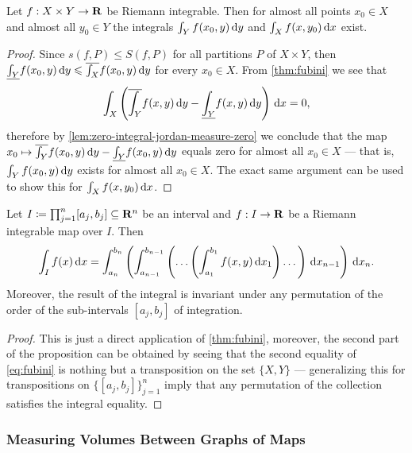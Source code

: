 \begin{corollary}
\label{cor:riemann-int-XxY-almost-int-X-and-Y}
Let \(f: X \times Y \to \mathbf{R}\) be Riemann integrable. Then for almost all points
\(x_0 \in X\) and almost all \(y_0 \in Y\) the integrals \(\int_Y f(x_0, y)\,
\mathrm{d} y\) and \(\int_X f(x, y_0)\, \mathrm{d} x\) exist.
\end{corollary}

\begin{proof}
Since \(s(f, P) \leq S(f, P)\) for all partitions \(P\) of \(X \times Y\), then
\(\underline{\int_Y} f(x_0, y)\, \mathrm{d} y \leqslant \overline{\int_X} f(x_0, y)\,
\mathrm{d} y\) for every \(x_0 \in X\). From \cref{thm:fubini} we see that
\[
  \int_X \left( \overline{\int_Y} f(x, y)\, \mathrm{d} y
    - \underline{\int_Y} f(x, y)\, \mathrm{d} y\right)\, \mathrm{d} x = 0,
\]
therefore by \cref{lem:zero-integral-jordan-measure-zero} we conclude that the
map \(x_0 \mapsto \overline{\int_Y} f(x_0, y)\, \mathrm{d} y - \underline{\int_Y}
f(x_0, y)\, \mathrm{d} y\) equals zero for almost all \(x_0 \in X\) --- that is,
\(\int_Y f(x_0, y)\, \mathrm{d} y\) exists for almost all \(x_0 \in X\). The exact
same argument can be used to show this for \(\int_X f(x, y_0)\, \mathrm{d} x\).
\end{proof}

\begin{corollary}
\label{cor:iterated-fubini-theorem}
Let \(I \coloneq \prod_{j = 1}^n [a_j, b_j] \subseteq \mathbf{R}^n\) be an interval and
\(f: I \to \mathbf{R}\) be a Riemann integrable map over \(I\). Then
\[
  \int_I f(x)\, \mathrm{d} x = \int_{a_n}^{b_n} \left(
    \int_{a_{n-1}}^{b_{n-1}} \left(
      \dots \left(
        \int_{a_1}^{b_1} f(x, y)\, \mathrm{d} x_1
      \right)
      \dots \right)\, \mathrm{d} x_{n-1} \right)\, \mathrm{d} x_n.
\]
Moreover, the result of the integral is invariant under any permutation of the
order of the sub-intervals \([a_j, b_j]\) of integration.
\end{corollary}

\begin{proof}
This is just a direct application of \cref{thm:fubini}, moreover, the second
part of the proposition can be obtained by seeing that the second equality of
\cref{eq:fubini} is nothing but a transposition on the set \(\{X, Y\}\) ---
generalizing this for transpositions on \(\{[a_j, b_j]\}_{j=1}^n\) imply that
any permutation of the collection satisfies the integral equality.
\end{proof}

\subsubsection{Measuring Volumes Between Graphs of Maps}

